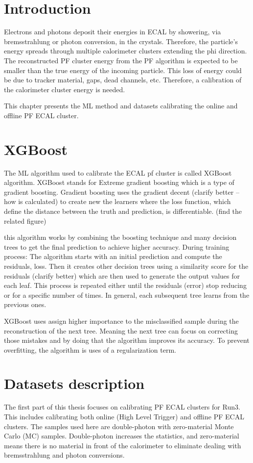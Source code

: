 
\section{Introduction}
Electrons and photons deposit their energies in ECAL by showering, via bremsstrahlung or photon conversion, in the crystals. Therefore, the particle's energy spreads through multiple calorimeter clusters extending the phi direction. The reconstructed PF cluster energy from the PF algorithm is expected to be smaller than the true energy of the incoming particle. This loss of energy could be due to tracker material, gaps, dead channels, etc. Therefore, a calibration of the calorimeter cluster energy is needed.  
 
This chapter presents the ML method and datasets calibrating the online and offline PF ECAL cluster.   

\section{XGBoost} %

The ML algorithm used to calibrate the ECAL pf cluster is called XGBoost algorithm. XGBoost stands for Extreme gradient boosting which is a type of gradient boosting. Gradient boosting uses the gradient decent (clarify better – how is calculated) to create new the learners where the loss function, which define the distance between the truth and prediction, is differentiable.  (find the related figure)

this algorithm works by combining the boosting technique and many decision trees to get the final prediction to achieve higher accuracy. During training process: The algorithm starts with an initial prediction and compute the residuals, loss. Then it creates other decision trees using a similarity score for the residuals (clarify better) which are then used to generate the output values for each leaf.  This process is repeated either until the residuals (error) stop reducing or for a specific number of times. In general, each subsequent tree learns from the previous ones.

XGBoost uses assign higher importance to the misclassified sample during the reconstruction of the next tree. Meaning the next tree can focus on correcting those mistakes and by doing that the algorithm improves its accuracy. To prevent overfitting, the algorithm is uses of a regularization term.


\section{Datasets description}
The first part of this thesis focuses on calibrating PF ECAL clusters for Run3. This includes calibrating both online (High Level Trigger) and offline PF ECAL clusters. The samples used here are double-photon with zero-material Monte Carlo (MC) samples. Double-photon increases the statistics, and zero-material means there is no material in front of the calorimeter to eliminate dealing with bremsstrahlung and photon conversions.    

